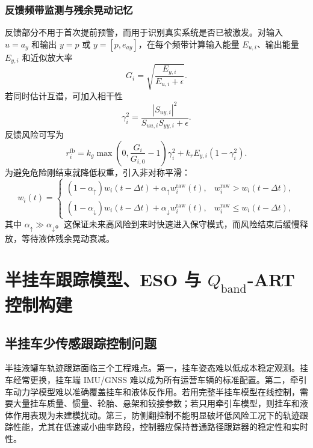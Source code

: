 \documentclass[UTF8,zihao=-4]{ctexrep}
\newcommand{\Qband}{$Q_{\mathrm{band}}$}
\newcommand{\ay}{a_y}
\begin{document}
\subsection{反馈频带监测与残余晃动记忆}
反馈部分不用于首次提前预警，而用于识别真实系统是否已被激发。对输入 $u=\ay$ 和输出 $y=p$ 或 $y=[p,e_{ay}]$，在每个频带计算输入能量 $E_{u,i}$、输出能量 $E_{y,i}$ 和近似放大率
\begin{equation}
    G_i=\sqrt{\frac{E_{y,i}}{E_{u,i}+\epsilon}}.
\end{equation}
若同时估计互谱，可加入相干性
\begin{equation}
    \gamma_i^2=\frac{|S_{uy,i}|^2}{S_{uu,i}S_{yy,i}+\epsilon}.
\end{equation}
反馈风险可写为
\begin{equation}
    r_i^{\mathrm{fb}}=k_g\max\left(0,\frac{G_i}{G_{i,0}}-1\right)\gamma_i^2+k_rE_{y,i}(1-\gamma_i^2).
\end{equation}
为避免危险刚结束就降低权重，引入非对称平滑：
\begin{equation}
    w_i(t)=
    \begin{cases}
    (1-\alpha_{\uparrow})w_i(t-\Delta t)+\alpha_{\uparrow}w_i^{\mathrm{raw}}(t), & w_i^{\mathrm{raw}}>w_i(t-\Delta t),\\
    (1-\alpha_{\downarrow})w_i(t-\Delta t)+\alpha_{\downarrow}w_i^{\mathrm{raw}}(t), & w_i^{\mathrm{raw}}\leq w_i(t-\Delta t),
    \end{cases}
\end{equation}
其中 $\alpha_{\uparrow}\gg\alpha_{\downarrow}$。这保证未来高风险到来时快速进入保守模式，而风险结束后缓慢释放，等待液体残余晃动衰减。

\chapter{半挂车跟踪模型、ESO 与 \Qband-ART 控制构建}

\section{半挂车少传感跟踪控制问题}
半挂液罐车轨迹跟踪面临三个工程难点。第一，挂车姿态难以低成本稳定观测。挂车经常更换，挂车端 IMU/GNSS 难以成为所有运营车辆的标准配置。第二，牵引车动力学模型难以准确覆盖挂车和液体反作用。若用完整半挂车模型在线控制，需要大量挂车质量、惯量、轮胎、悬架和铰接参数；若只用牵引车模型，则挂车和液体作用表现为未建模扰动。第三，防侧翻控制不能明显破坏低风险工况下的轨迹跟踪性能，尤其在低速或小曲率路段，控制器应保持普通路径跟踪器的稳定性和实时性。
\end{document}
